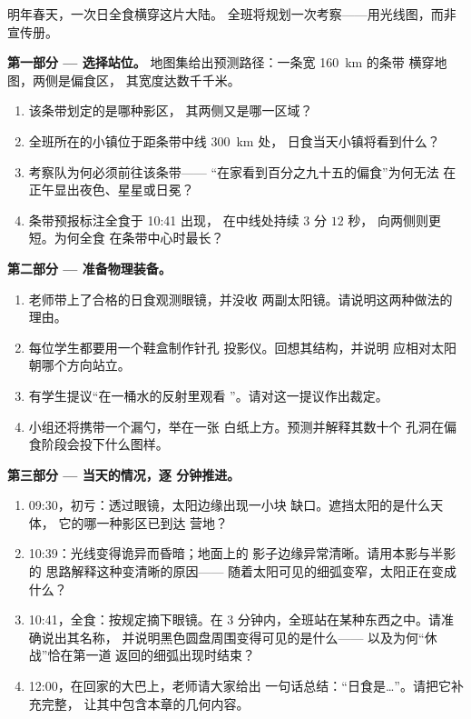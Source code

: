 \begin{problem}\label{pb:g7:shadows-eclipses:1}
明年春天，一次日全食横穿这片大陆。
全班将规划一次考察——用光线图，而非宣传册。

\medskip\noindent\textbf{第一部分 --- 选择站位。}
地图集给出预测路径：一条宽 \qty{160}{km} 的条带
横穿地图，两侧是偏食区，
其宽度达数千千米。
\begin{enumerate}
  \item 该条带划定的是哪种影区，
        其两侧又是哪一区域？
  \item 全班所在的小镇位于距条带中线 \qty{300}{km} 处，
        日食当天小镇将看到什么？
  \item 考察队为何必须前往该条带——
        “在家看到百分之九十五的偏食”为何无法
        在正午显出夜色、星星或日冕？
  \item 条带预报标注全食于 10:41 出现，
        在中线处持续 $3$ 分 $12$ 秒，
        向两侧则更短。为何全食
        在条带中心时最长？
\end{enumerate}

\medskip\noindent\textbf{第二部分 --- 准备物理装备。}
\begin{enumerate}[resume]
  \item 老师带上了合格的日食观测眼镜，并没收
        两副太阳镜。请说明这两种做法的理由。
  \item 每位学生都要用一个鞋盒制作针孔
        投影仪。回想其结构，并说明
        应相对太阳朝哪个方向站立。
  \item 有学生提议“在一桶水的反射里观看
        ”。请对这一提议作出裁定。
  \item 小组还将携带一个漏勺，举在一张
        白纸上方。预测并解释其数十个
        孔洞在偏食阶段会投下什么图样。
\end{enumerate}

\medskip\noindent\textbf{第三部分 --- 当天的情况，逐
分钟推进。}
\begin{enumerate}[resume]
  \item 09:30，初亏：透过眼镜，太阳边缘出现一小块
        缺口。遮挡太阳的是什么天体，
        它的哪一种影区已到达
        营地？
  \item 10:39：光线变得诡异而昏暗；地面上的
        影子边缘异常清晰。请用本影与半影的
        思路解释这种变清晰的原因——
        随着太阳可见的细弧变窄，太阳正在变成什么？
  \item 10:41，全食：按规定摘下眼镜。在 $3$
        分钟内，全班站在某种东西之中。请准确说出其名称，
        并说明黑色圆盘周围变得可见的是什么——
        以及为何“休战”恰在第一道
        返回的细弧出现时结束？
  \item 12:00，在回家的大巴上，老师请大家给出
        一句话总结：“日食是\dots”。请把它补充完整，
        让其中包含本章的几何内容。
\end{enumerate}
\end{problem}
